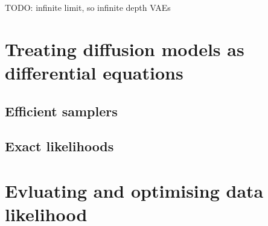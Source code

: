 

TODO: infinite limit, so infinite depth VAEs


\section{Treating diffusion models as differential equations}
\subsection{Efficient samplers}
\subsection{Exact likelihoods}










\section{Evluating and optimising data likelihood} \label{sec:diffusion-likelihood}


